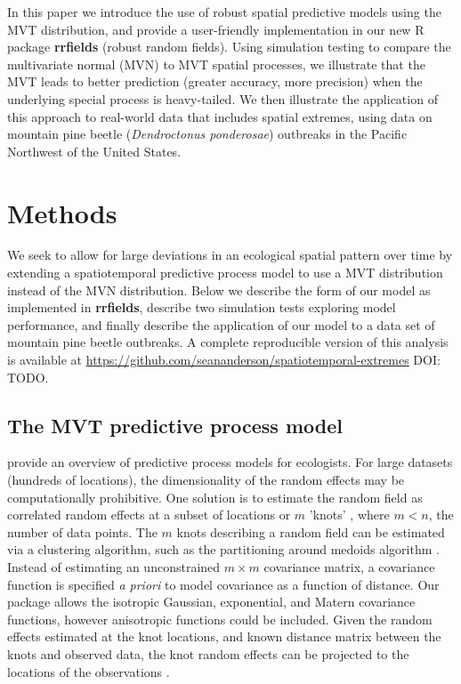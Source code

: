 \documentclass[12pt,english]{article}
\begin{document}
\begin{spacing}{1.9}
In this paper we introduce the use of robust spatial predictive models using
the MVT distribution, and provide a user-friendly implementation in our new
R package \textbf{rrfields} (robust random fields). Using simulation testing
to compare the multivariate normal (MVN) to MVT spatial processes, we
illustrate that the MVT leads to better prediction (greater accuracy, more
precision) when the underlying special process is heavy-tailed. We then
illustrate the application of this approach to real-world data that includes
spatial extremes, using data on mountain pine beetle (\textit{Dendroctonus
  ponderosae}) outbreaks in the Pacific Northwest of the United States.

\section{Methods}

We seek to allow for large deviations in an ecological spatial pattern over
time by extending a spatiotemporal predictive process model to use a MVT
distribution instead of the MVN distribution. Below we describe the form of
our model as implemented in \textbf{rrfields}, describe two simulation tests
exploring model performance, and finally describe the application of our model
to a data set of mountain pine beetle outbreaks.
A complete reproducible version of this analysis is available at
\url{https://github.com/seananderson/spatiotemporal-extremes} DOI: TODO.

\subsection{The MVT predictive process model}

\citet{latimer2009} provide an overview of predictive process models for
ecologists. For large datasets (hundreds of locations), the dimensionality of the random 
effects may be computationally prohibitive. One solution is to estimate the random
field as correlated random effects at a subset of locations or $m$ 'knots'
\citep[e.g.][]{latimer2009, shelton2014}, where $m < n$, the number of data points. The 
$m$ knots describing a random field can be estimated via a clustering algorithm, 
such as the partitioning around medoids
algorithm \citep[the \texttt{pam} function in the R package
\textbf{cluster};][]{reynolds2006}. 
Instead of estimating an unconstrained $m \times m$ covariance matrix, a covariance
function is specified \emph{a priori} to model covariance as a function of distance. 
Our package allows the isotropic Gaussian, exponential, and Matern covariance functions, 
however anisotropic functions could be included. Given the random
effects estimated at the knot locations, and known distance matrix between the knots
and observed data, the knot random effects can be projected to the locations of the
observations \citep[][Figure~\ref{fig:didactic}]{latimer2009, finley2009}. 


\end{spacing}
\end{document}
